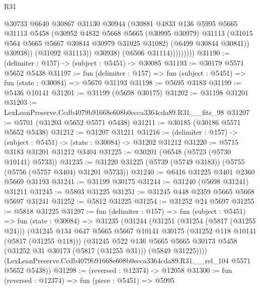 \begin{lexlean}{R31}
\begin{coremodule}
                          @30733
                          @6640
                          @30867
                          @31130
                          @30944
                          (@30881
                            @4833
                            @136
                            @5995
                            @5665
                            @31113
                            @5458
                            (@30952
                              @4832
                              @5668
                              @5665
                              (@30995 @30979)
                              @31113
                              (@31015 @564 @5665 @5667 @30844 @30979 @31025 @31082)
                              (@6499 @30844 @30841))
                            @30938))
                        (@31092 @31113))
                      @30938)
                    (@6506 @31114)))))))))
@31190 := (delimiter : @157) -> (subject : @5451) -> @30085
@31193 := @30179 @5571 @5652 @5438
@31197 := fun (delimiter : @157) => fun (subject : @5451) => fun (state : @30084) => @5670 @31193
@31198 := @5695 @3183
@31199 := @5436 @10141
@31201 := @31199 (@5698 @30175)
@31202 := @31198 @31201
@31203 := LexLeanPreserve.Ccdb4079b91668e608b0ecca3364cda89.R31.__fits_98
@31207 := @5701 (@31203 @5652 @5571 @5438)
@31211 := @30185 (@30186 @5571 @5652 @5438)
@31212 := @31207 @31211
@31216 := (delimiter : @157) -> (subject : @5451) -> (state : @30084) -> @31202 @31212
@31220 := @5715 @3183 @31201 @31212 @3404
@31225 := @30201 (@6548 (@5723 (@5730 @10141) @5733))
@31235 := @31220 @31225 (@5739 (@5749 @3183)) (@5755 (@5756 (@5757 @3404) @31201 @5733))
@31240 := @6416 @31225 @3401 @2360 @5669 @31193
@31241 := @31199 @30175
@31244 := @31240 (@5698 @31241) @31211
@31245 := @5803 @31225
@31251 := @31245 @448 @2359 @5665 @5668 @5697 @31241
@31252 := @5812 @31225
@31254 := @31252 @24 @5697
@31255 := @5818 @31225
@31297 := fun (delimiter : @157) =>
  fun (subject : @5451) =>
  fun (state : @30084) =>
  @31235
    (@31244
      (@31251
        (@31254 (@5817 (@31255 @24)))
        (@31245
          @134
          @647
          @5665
          @5667
          @10141
          @30175
          (@31252 @118 @10141 (@5817 (@31255 @118)))
          (@31245
            @522
            @136
            @5665
            @5665
            @30173
            @5458
            (@31252 @31 @30173 (@5817 (@31255 @31)))
            (@5849 @31225))))
      (LexLeanPreserve.Ccdb4079b91668e608b0ecca3364cda89.R31.__rel_104 @5571 @5652 @5438))
@31298 := (reversed : @12374) -> @12058
@31300 := fun (reversed : @12374) => fun (piece : @5451) => @5995

\end{coremodule}
\end{lexlean}
